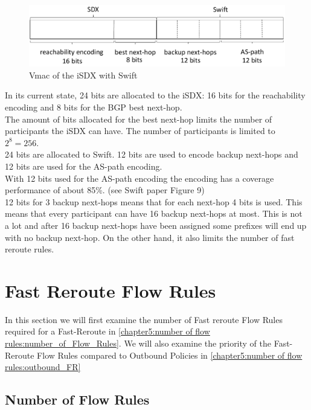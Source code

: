 \begin{figure}[h]
\center
\includegraphics[scale = 0.65]{Figures/eval_vmac_cropped2.pdf}
\caption{Vmac of the iSDX with Swift}
\end{figure}

In its current state, 24 bits are allocated to the iSDX: 16 bits for the reachability encoding and 8 bits for the BGP best next-hop. \\
The amount of bits allocated for the best next-hop limits the number of participants the iSDX can have. The number of participants is limited to $2^8 = 256$. \\
24 bits are allocated to Swift. 12 bits are used to encode backup next-hops and 12 bits are used for the AS-path encoding. \\
With 12 bits used for the AS-path encoding the encoding has a coverage performance of about 85\%. (see Swift paper Figure 9)\\
12 bits for 3 backup next-hops means that for each next-hop 4 bits is used. This means that every participant can have 16 backup next-hops at most. This is not a lot and after 16 backup next-hops have been assigned some prefixes will end up with no backup next-hop. On the other hand, it also limits the number of fast reroute rules. \\

\section{\label{chapter6:number of flow rules}Fast Reroute Flow Rules}

In this section we will first examine the number of Fast reroute Flow Rules required for a Fast-Reroute in \ref{chapter5:number of flow rules:number_of_Flow_Rules}. We will also examine the priority of the Fast-Reroute Flow Rules compared to Outbound Policies in \ref{chapter5:number of flow rules:outbound_FR}

\subsection{\label{chapter6:number of flow rules:number_of_Flow_Rules}Number of Flow Rules}

